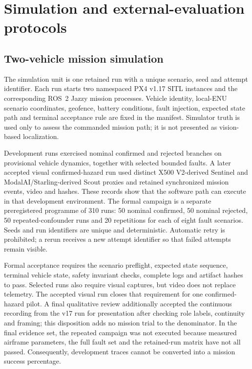 \section{Simulation and external-evaluation protocols}
\label{sec:methodology:7}

\subsection{Two-vehicle mission simulation}

The simulation unit is one retained run with a unique scenario, seed and
attempt identifier. Each run starts two namespaced PX4 v1.17 SITL instances and
the corresponding ROS~2 Jazzy mission processes. Vehicle identity, local-ENU
scenario coordinates, geofence, battery conditions, fault injection, expected
state path and terminal acceptance rule are fixed in the manifest. Simulator
truth is used only to assess the commanded mission path; it is not presented as
vision-based localization.

Development runs exercised nominal confirmed and rejected branches on
provisional vehicle dynamics, together with selected bounded faults. A later
accepted visual confirmed-hazard run used distinct X500 V2-derived Sentinel and
ModalAI/Starling-derived Scout proxies and retained synchronized mission events,
video and hashes. These records show that the software path can execute in that
development environment. The
formal campaign is a separate preregistered programme of 310 runs: 50 nominal
confirmed, 50 nominal rejected, 50 repeated-confounder runs and 20 repetitions
for each of eight fault scenarios. Seeds and run identifiers are unique and
deterministic. Automatic retry is prohibited; a rerun receives a new attempt
identifier so that failed attempts remain visible.

Formal acceptance requires the scenario preflight, expected state sequence,
terminal vehicle state, safety invariant checks, complete logs and artifact
hashes to pass. Selected runs also require visual captures, but video does not
replace telemetry. The accepted visual run closes that requirement for one
  confirmed-hazard pilot. A final qualitative review additionally accepted the
  continuous recording from the v17 run for presentation after checking role
  labels, continuity and framing; this disposition adds no mission trial to the
  denominator. In the final evidence set, the repeated campaign was not executed
because measured airframe parameters, the full fault set and the retained-run
matrix have not all passed. Consequently, development traces cannot be
converted into a mission success percentage.

